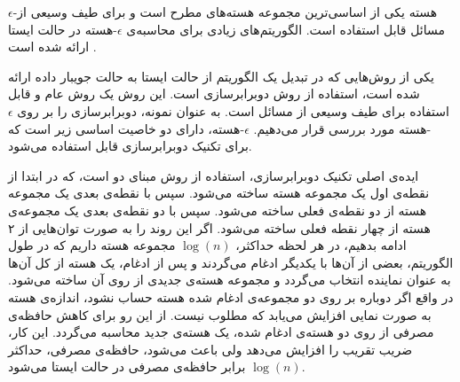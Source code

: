
$\epsilon$-هسته 
یکی از اساسی‌ترین مجموعه هسته‌های مطرح است و برای طیف وسیعی از مسائل قابل استفاده است.
الگوریتم‌های زیادی برای محاسبه‌ی $\epsilon$-هسته در حالت ایستا ارائه شده است . 

یکی از روش‌هایی که در تبدیل یک الگوریتم از حالت ایستا به حالت جویبار داده ارائه شده است، استفاده از روش دوبرابرسازی است.
این روش یک روش عام و قابل استفاده برای طیف وسیعی از مسائل است.
به عنوان نمونه، دوبرابرسازی را بر روی $\epsilon$-هسته مورد بررسی قرار می‌دهیم. $\epsilon$-هسته، دارای دو خاصیت اساسی زیر است که برای تکنیک دوبرابرسازی قابل استفاده می‌شود.






ایده‌ی اصلی تکنیک دوبرابرسازی، استفاده از روش مبنای دو است، که در ابتدا از نقطه‌ی اول یک مجموعه هسته ساخته می‌شود.
سپس با نقطه‌ی بعدی یک مجموعه هسته از دو نقطه‌ی فعلی ساخته می‌شود.
سپس با دو نقطه‌ی بعدی یک مجموعه‌ی هسته از چهار نقطه فعلی ساخته می‌شود.
اگر این روند را به صورت توان‌هایی از ۲ ادامه بدهیم، در هر لحظه حداکثر، $\log(n)$ مجموعه هسته داریم که در طول الگوریتم، بعضی از آن‌ها با یکدیگر ادغام می‌گردند و پس از ادغام، یک هسته از کل آن‌ها به عنوان نماینده انتخاب می‌گردد و مجموعه هسته‌ی جدیدی از روی آن ساخته می‌شود.
در واقع اگر دوباره بر روی دو مجموعه‌ی ادغام شده هسته حساب نشود، اندازه‌ی هسته به صورت نمایی افزایش می‌یابد که مطلوب نیست.
از این رو برای کاهش حافظه‌ی مصرفی از روی دو هسته‌ی ادغام شده، یک هسته‌ی جدید محاسبه می‌گردد.
این کار، ضریب تقریب را افزایش می‌دهد ولی باعث می‌شود، حافظه‌ی مصرفی، حداکثر $\log(n)$ برابر حافظه‌ی مصرفی در حالت ایستا می‌شود.